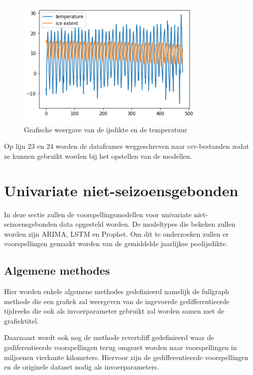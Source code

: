 \begin{figure}[!h]
    \centering
    \caption{Grafische weergave van de ijsdikte en de temperatuur}
    \label{fig:combinedmonths}
    \includegraphics[width=0.7\linewidth]{combined_months.PNG}
\end{figure}

Op lijn 23 en 24 worden de dataframes weggeschreven naar csv-bestanden zodat ze kunnen gebruikt worden bij het opstellen van de modellen.


\section{Univariate niet-seizoensgebonden}

In deze sectie zullen de voorspellingsmodellen voor univariate niet-seizoensgebonden data opgesteld worden. De modeltypes die bekeken zullen worden zijn ARIMA, LSTM en Prophet. Om dit te onderzoeken zullen er voorspellingen gemaakt worden van de gemiddelde jaarlijkse poolijsdikte.

\subsection{Algemene methodes}

Hier worden enkele algemene methodes gedefinieerd namelijk de full\textunderscore graph methode die een grafiek zal weergeven van de ingevoerde gedifferentieerde tijdreeks die ook als invoerparameter gebruikt zal worden samen met de grafiektitel.

Daarnaast wordt ook nog de methode revert\textunderscore diff gedefinieerd waar de gediferentieerde voorspellingen terug omgezet worden naar voorspellingen in miljoenen vierkante kilometers. Hiervoor zijn de gedifferentieerde voorspellingen en de originele dataset nodig als invoerparameters.

